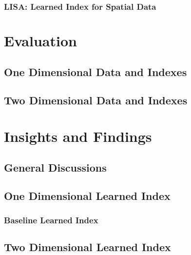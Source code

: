 \documentclass[a4paper,12pt]{scrreprt}
\begin{document}


\subsection{LISA: Learned Index for Spatial Data}



\chapter{Evaluation}



\section{One Dimensional Data and Indexes}



\section{Two Dimensional Data and Indexes}



\chapter{Insights and Findings}

\section{General Discussions}



\section{One Dimensional Learned Index}

\subsection{Baseline Learned Index}



\section{Two Dimensional Learned Index}
\end{document}
